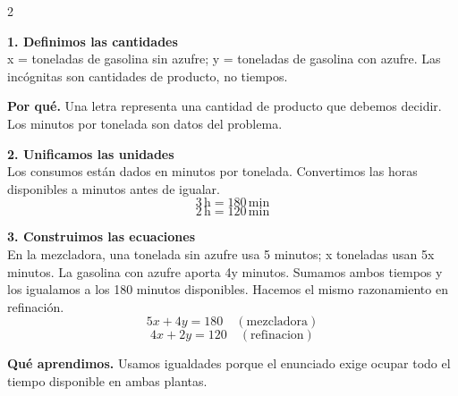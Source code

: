 \documentclass[11pt,a4paper,landscape]{article}
\begin{document}
\begin{multicols*}{2}
\noindent\begin{minipage}{\linewidth}\textbf{1. Definimos las cantidades}\\[2pt]x = toneladas de gasolina sin azufre; y = toneladas de gasolina con azufre. Las incógnitas son cantidades de producto, no tiempos.
\par\smallskip\textbf{Por qué.} Una letra representa una cantidad de producto que debemos decidir. Los minutos por tonelada son datos del problema.
\par{}\par\smallskip
\end{minipage}\par\medskip
\noindent\begin{minipage}{\linewidth}\textbf{2. Unificamos las unidades}\\[2pt]Los consumos están dados en minutos por tonelada. Convertimos las horas disponibles a minutos antes de igualar.
\[3\,\mathrm{h}=180\,\mathrm{min}\]
\[2\,\mathrm{h}=120\,\mathrm{min}\]
\end{minipage}\par\medskip
\noindent\begin{minipage}{\linewidth}\textbf{3. Construimos las ecuaciones}\\[2pt]En la mezcladora, una tonelada sin azufre usa 5 minutos; x toneladas usan 5x minutos. La gasolina con azufre aporta 4y minutos. Sumamos ambos tiempos y los igualamos a los 180 minutos disponibles. Hacemos el mismo razonamiento en refinación.
\[5x+4y=180\quad(\mathrm{mezcladora})\]
\[4x+2y=120\quad(\mathrm{refinacion})\]
\par\smallskip\textbf{Qué aprendimos.} Usamos igualdades porque el enunciado exige ocupar todo el tiempo disponible en ambas plantas.
\end{minipage}\par\medskip

\end{multicols*}
\end{document}
